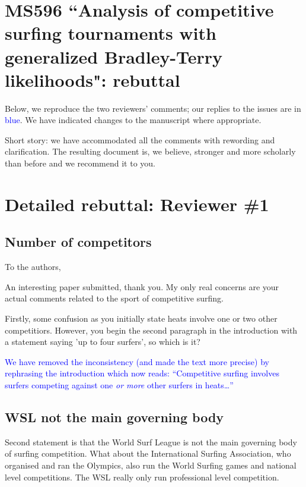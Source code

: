 \documentclass[12pt]{article}
\begin{document}
\section*{MS596 ``Analysis of competitive surfing tournaments with generalized Bradley-Terry likelihoods": rebuttal}

Below, we reproduce the two reviewers' comments; our replies to the
issues are in \textcolor{blue}{blue}.  We have indicated changes to
the manuscript where appropriate.

Short story: we have accommodated all the comments with rewording and
clarification.  The resulting document is, we believe, stronger and
more scholarly than before and we recommend it to you.

\section*{Detailed rebuttal: Reviewer \#1}



\subsection*{Number of competitors}

To the authors,

An interesting paper submitted, thank you. My only
real concerns are your actual comments related to the sport of
competitive surfing.

Firstly, some confusion as you initially state heats involve one or
two other competitiors. However, you begin the second paragraph in the
introduction with a statement saying 'up to four surfers', so which is
it?

\textcolor{blue}{We have removed the inconsistency (and made the text
  more precise) by rephrasing the introduction which now reads:
  ``Competitive surfing involves surfers competing against one {\em or
    more} other surfers in heats\ldots''}

\subsection*{WSL not the main governing body}

Second statement is that the World Surf League is not the main
governing body of surfing competition. What about the International
Surfing Association, who organised and ran the Olympics, also run the
World Surfing games and national level competitions. The WSL really
only run professional level competition.
\end{document}
